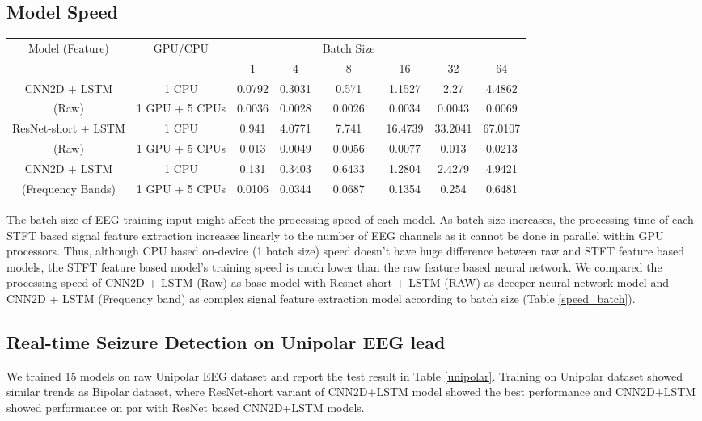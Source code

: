 \documentclass[pmlr,twocolumn,10pt]{jmlr}
\begin{document}
\subsection{Model Speed}
\begin{table*}[h!]
    \footnotesize
	\centering
	\caption{Computation speed (sec) per one 4 seconds size window of CNN2D + LSTM (RAW) as base model, Resnet-short + LSTM (RAW) as deeper nerual network model and CNN2D + LSTM (Frequency Based) as more complex signal feature extraction method model according to input batch size.}
	\label{speed_batch}
	\begin{tabular}{c|c|cccccc}
		\toprule
		Model (Feature) & GPU/CPU & & & Batch Size &  & & \\
		&& 1 & 4 & 8 & 16 & 32 & 64 \\
		\midrule
		CNN2D + LSTM & 1 CPU & 0.0792 &	0.3031 & 0.571 &	1.1527 & 2.27 &	4.4862  \\
		(Raw) & 1 GPU + 5 CPUs & 0.0036 & 0.0028 & 0.0026 & 0.0034 & 0.0043 & 0.0069\\
		\midrule
		ResNet-short + LSTM & 1 CPU & 0.941 & 4.0771 & 7.741 & 16.4739 & 33.2041 & 67.0107 \\
		(Raw) & 1 GPU + 5 CPUs & 0.013 & 0.0049 & 0.0056 & 0.0077 & 0.013 & 0.0213\\
		\midrule
		CNN2D + LSTM & 1 CPU & 0.131 & 0.3403 & 0.6433 & 1.2804 & 2.4279 & 4.9421 \\
        (Frequency Bands) & 1 GPU + 5 CPUs & 0.0106 & 0.0344 & 0.0687 & 0.1354 & 0.254 & 0.6481\\
		\bottomrule
	\end{tabular}
\end{table*} The batch size of EEG training input might affect the processing speed of each model. As batch size increases, the processing time of each STFT based signal feature extraction increases linearly to the number of EEG channels as it cannot be done in parallel within GPU processors. Thus, although CPU based on-device (1 batch size) speed doesn't have huge difference between raw and STFT feature based models, the STFT feature based model's training speed is much lower than the raw feature based neural network. We compared the processing speed of CNN2D + LSTM (Raw) as base model with Resnet-short + LSTM (RAW) as deeeper neural network model and CNN2D + LSTM (Frequency band) as complex signal feature extraction model according to batch size (Table \ref{speed_batch}). 



\subsection{Real-time Seizure Detection on Unipolar EEG lead}
We trained 15 models on raw Unipolar EEG dataset and report the test result in Table \ref{unipolar}. Training on Unipolar dataset showed similar trends as Bipolar dataset, where ResNet-short variant of CNN2D+LSTM model showed the best performance and CNN2D+LSTM showed performance on par with ResNet based CNN2D+LSTM models.
\end{document}
